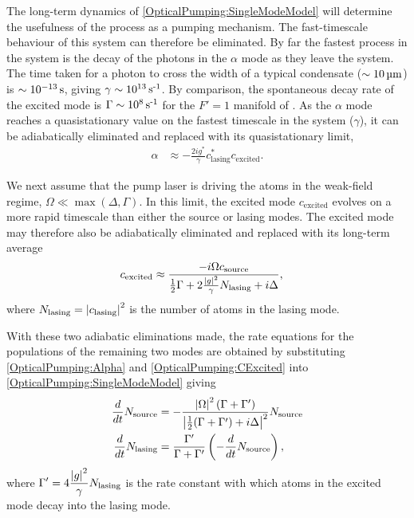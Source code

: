 The long-term dynamics of \eqref{OpticalPumping:SingleModeModel} will determine the usefulness of the process as a pumping mechanism.  The fast-timescale behaviour of this system can therefore be eliminated.  By far the fastest process in the system is the decay of the photons in the $\alpha$ mode as they leave the system.  The time taken for a photon to cross the width of a typical condensate ($\sim\unit[10]{\micro m}$) is $\sim\unit[10^{-13}]{s}$, giving $\gamma \sim \unit[10^{13}]{s\textsuperscript{-1}}$.  By comparison, the spontaneous decay rate of the excited mode is $\Gamma \sim \unit[10^8]{s\textsuperscript{-1}}$ for the $F'=1$ manifold of .  As the $\alpha$ mode reaches a quasistationary value on the fastest timescale in the system ($\gamma$), it can be adiabatically eliminated and replaced with its quasistationary limit,
\begin{align}
    \alpha & \approx -\frac{2 i g^*}{\gamma} c_\text{lasing}^* c_\text{excited}. \label{OpticalPumping:Alpha}
\end{align}

We next assume that the pump laser is driving the atoms in the weak-field regime, $\Omega \ll \max\left(\Delta, \Gamma\right)$.  In this limit, the excited mode $c_\text{excited}$ evolves on a more rapid timescale than either the source or lasing modes.  The excited mode may therefore also be adiabatically eliminated and replaced with its long-term average
\begin{align}
    c_\text{excited} &\approx \frac{-i \Omega c_\text{source}}{\frac{1}{2}\Gamma + 2 \frac{\abs{g}^2}{\gamma} N_\text{lasing} + i \Delta}, \label{OpticalPumping:CExcited}
\end{align}
where $N_\text{lasing} = \left|c_\text{lasing}\right|^2$ is the number of atoms in the lasing mode.

With these two adiabatic eliminations made, the rate equations for the populations of the remaining two modes are obtained by substituting \eqref{OpticalPumping:Alpha} and \eqref{OpticalPumping:CExcited} into \eqref{OpticalPumping:SingleModeModel} giving
\begin{subequations}
    \label{OpticalPumping:SingleModeRateEquations}
    \begin{align}
        \frac{d}{dt} N_\text{source} &= - \frac{\abs{\Omega}^2 \left(\Gamma + \Gamma'\right)}{\abs{\frac{1}{2}(\Gamma + \Gamma') + i \Delta}^2} N_\text{source}\\
        \frac{d}{dt} N_\text{lasing} &= \frac{\Gamma'}{\Gamma + \Gamma'} \left( - \frac{d}{dt} N_\text{source}\right),
    \end{align}
\end{subequations}
where $\displaystyle \Gamma' = 4 \frac{\left|g\right|^2}{\gamma} N_\text{lasing}$ is the rate constant with which atoms in the excited mode decay into the lasing mode.

